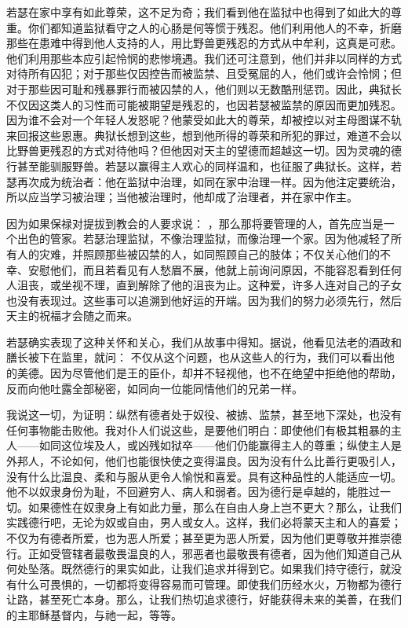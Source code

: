 若瑟在家中享有如此尊荣，这不足为奇；我们看到他在监狱中也得到了如此大的尊重。你们都知道监狱看守之人的心肠是何等惯于残忍。他们利用他人的不幸，折磨那些在患难中得到他人支持的人，用比野兽更残忍的方式从中牟利，这真是可悲。他们利用那些本应引起怜悯的悲惨境遇。我们还可注意到，他们并非以同样的方式对待所有囚犯；对于那些仅因控告而被监禁、且受冤屈的人，他们或许会怜悯；但对于那些因可耻和残暴罪行而被囚禁的人，他们则以无数酷刑惩罚。因此，典狱长不仅因这类人的习性而可能被期望是残忍的，也因若瑟被监禁的原因而更加残忍。因为谁不会对一个年轻人发怒呢？他蒙受如此大的尊荣，却被控以对主母图谋不轨来回报这些恩惠。典狱长想到这些，想到他所得的尊荣和所犯的罪过，难道不会以比野兽更残忍的方式对待他吗？但他因对天主的望德而超越这一切。因为灵魂的德行甚至能驯服野兽。若瑟以赢得主人欢心的同样温和，也征服了典狱长。这样，若瑟再次成为统治者：他在监狱中治理，如同在家中治理一样。因为他注定要统治，所以应当学习被治理；当他被治理时，他却成了治理者，并在家中作主。\par

因为如果保禄对提拔到教会的人要求说： ，那么那将要管理的人，首先应当是一个出色的管家。若瑟治理监狱，不像治理监狱，而像治理一个家。因为他减轻了所有人的灾难，并照顾那些被囚禁的人，如同照顾自己的肢体；不仅关心他们的不幸、安慰他们，而且若看见有人愁眉不展，他就上前询问原因，不能容忍看到任何人沮丧，或坐视不理，直到解除了他的沮丧为止。这种爱，许多人连对自己的子女也没有表现过。这些事可以追溯到他好运的开端。因为我们的努力必须先行，然后天主的祝福才会随之而来。\par

若瑟确实表现了这种关怀和关心，我们从故事中得知。据说，他看见法老的酒政和膳长被下在监里，就问： 不仅从这个问题，也从这些人的行为，我们可以看出他的美德。因为尽管他们是王的臣仆，却并不轻视他，也不在绝望中拒绝他的帮助，反而向他吐露全部秘密，如同向一位能同情他们的兄弟一样。\par

我说这一切，为证明：纵然有德者处于奴役、被掳、监禁，甚至地下深处，也没有任何事物能击败他。我对仆人们说这些，是要他们明白：即使他们有极其粗暴的主人——如同这位埃及人，或凶残如狱卒——他们仍能赢得主人的尊重；纵使主人是外邦人，不论如何，他们也能很快使之变得温良。因为没有什么比善行更吸引人，没有什么比温良、柔和与服从更令人愉悦和喜爱。具有这种品性的人能适应一切。他不以奴隶身份为耻，不回避穷人、病人和弱者。因为德行是卓越的，能胜过一切。如果德性在奴隶身上有如此力量，那么在自由人身上岂不更大？那么，让我们实践德行吧，无论为奴或自由，男人或女人。这样，我们必将蒙天主和人的喜爱；不仅为有德者所爱，也为恶人所爱；甚至更为恶人所爱，因为他们更尊敬并推崇德行。正如受管辖者最敬畏温良的人，邪恶者也最敬畏有德者，因为他们知道自己从何处坠落。既然德行的果实如此，让我们追求并得到它。如果我们持守德行，就没有什么可畏惧的，一切都将变得容易而可管理。即使我们历经水火，万物都为德行让路，甚至死亡本身。那么，让我们热切追求德行，好能获得未来的美善，在我们的主耶稣基督内，与祂一起，等等。\par

